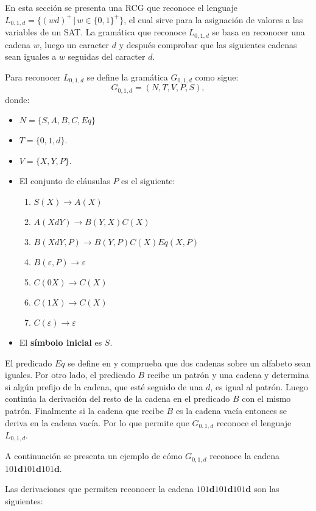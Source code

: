 En esta sección se presenta una RCG que reconoce el lenguaje $L_{0,1,d}=\{(wd)^+\,|\,w\in\{0,1\}^+\}$, el cual 
sirve para la asignación de valores a las variables de un SAT. La gramática que reconoce $L_{0,1,d}$ se basa 
en reconocer una cadena $w$, luego un caracter $d$ y después comprobar que las siguientes cadenas sean iguales 
a $w$ seguidas del caracter $d$.

Para reconocer $L_{0,1,d}$ se define la gramática $G_{0,1,d}$ como sigue:
\[
    G_{0,1,d} = (N, T, V, P, S),
\]
donde:

\begin{itemize}
    \item $N=\{S,A,B,C,Eq\}$
    \item $T=\{0,1,d\}$.
    \item $V=\{X,Y,P\}$.
    \item El conjunto de cláusulas $P$ es el siguiente:
          \begin{enumerate}
              \item $S(X)\to A(X)$
              \item $A(XdY)\to B(Y,X)C(X)$
              \item $B(XdY,P)\to B(Y,P) C(X) Eq(X,P)$
              \item $B(\varepsilon,P)\to \varepsilon$
              \item $C(0X)\to C(X)$
              \item $C(1X)\to C(X)$
              \item $C(\varepsilon)\to \varepsilon$
          \end{enumerate}
    \item El \textbf{símbolo inicial} es $S$.
\end{itemize}

El predicado $Eq$ se define en \cite{mainRCGBib} y comprueba que dos cadenas sobre un alfabeto sean iguales.  
Por otro lado, el predicado $B$ recibe un patrón y una cadena y determina si algún prefijo de la cadena, que 
esté seguido de una $d$, es igual al patrón. Luego continúa la derivación del resto de la cadena en el predicado 
$B$ con el mismo patrón. Finalmente si la cadena que recibe $B$ es 
la cadena vacía entonces se deriva en la cadena vacía. Por lo que permite que $G_{0,1,d}$ reconoce el lenguaje $L_{0,1,d}$.

A continuación se presenta un ejemplo de cómo $G_{0,1,d}$ reconoce la cadena $101\mathbf{d}101\mathbf{d}101\mathbf{d}$.

Las derivaciones que permiten reconocer la cadena $101\mathbf{d}101\mathbf{d}101\mathbf{d}$ son las siguientes:

